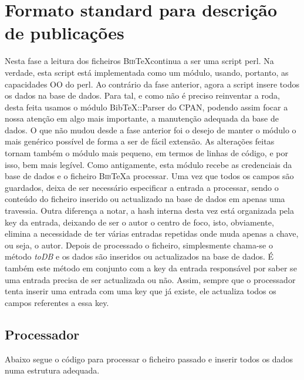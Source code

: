 \documentclass[a4paper,11pt,openright,openbib]{article}
\begin{document}
\section{Formato standard para descrição de publicações}
Nesta fase a leitura dos ficheiros \textsc{Bib}\negthinspace\TeX continua a ser uma script perl. Na verdade, esta script está implementada como um módulo, usando, portanto, as capacidades OO do perl. Ao contrário da fase anterior, agora a script insere todos os dados na base de dados. Para tal, e como não é preciso reinventar a roda, desta feita usamos o módulo BibTeX::Parser do CPAN, podendo assim focar a nossa atenção em algo mais importante, a manutenção adequada da base de dados. O que não mudou desde a fase anterior foi o desejo de manter o módulo o mais genérico possível de forma a ser de fácil extensão. As alterações feitas tornam também o módulo mais pequeno, em termos de linhas de código, e por isso, bem mais legível. Como antigamente, esta módulo recebe as credenciais da base de dados e o ficheiro \textsc{Bib}\negthinspace\TeX a processar. Uma vez que todos os campos são guardados, deixa de ser necessário especificar a entrada a processar, sendo o conteúdo do ficheiro inserido ou actualizado na base de dados em apenas uma travessia. Outra diferença a notar, a hash interna desta vez está organizada pela key da entrada, deixando de ser o autor o centro de foco, isto, obviamente, elimina a necessidade de ter várias entradas repetidas onde muda apenas a chave, ou seja, o autor. Depois de processado o ficheiro, simplesmente chama-se o método \textit{toDB} e os dados são inseridos ou actualizados na base de dados. É também este método em conjunto com a key da entrada responsável por saber se uma entrada precisa de ser actualizada ou não. Assim, sempre que o processador tenta inserir uma entrada com uma key que já existe, ele actualiza todos os campos referentes a essa key. 

\subsection{Processador}
Abaixo segue o código para processar o ficheiro passado e inserir todos os dados numa estrutura adequada.
\end{document}
